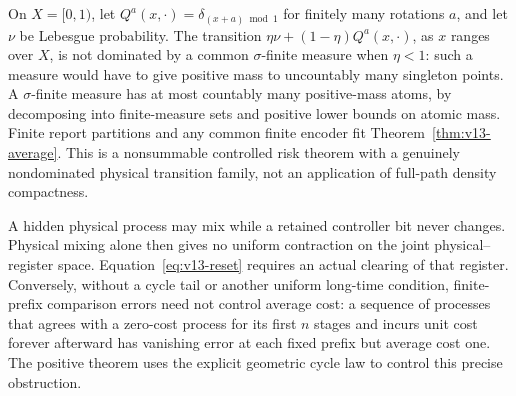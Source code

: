\begin{example}
On $X=[0,1)$, let $Q^a(x,\cdot)=\delta_{(x+a)\bmod1}$ for finitely
many rotations $a$, and let $\nu$ be Lebesgue probability. The transition
$\eta\nu+(1-\eta)Q^a(x,\cdot)$, as $x$ ranges over $X$, is not dominated
by a common $\sigma$-finite measure when $\eta<1$: such a measure would
have to give positive mass to uncountably many singleton points.
A $\sigma$-finite measure has at most countably many positive-mass
atoms, by decomposing into finite-measure sets and positive lower
bounds on atomic mass. Finite report partitions and any common finite
encoder fit Theorem~\ref{thm:v13-average}. This is a nonsummable
controlled risk theorem with a genuinely nondominated physical
transition family, not an application of full-path density compactness.
\end{example}

\begin{remark}
A hidden physical process may mix while a retained controller bit never
changes. Physical mixing alone then gives no uniform contraction on
the joint physical--register space. Equation~\eqref{eq:v13-reset}
requires an actual clearing of that register. Conversely, without a
cycle tail or another uniform long-time condition, finite-prefix
comparison errors need not control average cost: a sequence of
processes that agrees with a zero-cost process for its first $n$ stages
and incurs unit cost forever afterward has vanishing error at each
fixed prefix but average cost one. The positive theorem uses the
explicit geometric cycle law to control this precise obstruction.
\end{remark}
